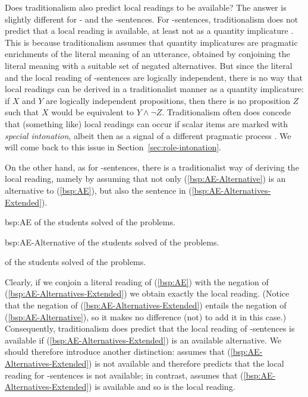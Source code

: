 \documentclass[fleqn,reqno,10pt,draft]{article}
\newcommand{\as}{\acro{as}}
\renewcommand{\es}{\acro{es}}
\begin{document}
Does traditionalism also predict local readings to be available?  The
answer is slightly different for \as- and the \es-sentences. For
\es-sentences, traditionalism does not predict that a local reading is
available, at least not as a quantity implicature
\citep[c.f.][]{GeurtsPouscoulous2009:Embedded-Implic,ChemlaSpector2010:Experimental-Ev}. This
is because traditionalism assumes that quantity implicatures are
pragmatic enrichments of the literal meaning of an utterance, obtained
by conjoining the literal meaning with a suitable set of negated
alternatives. But since the literal and the local reading of
\es-sentences are logically independent, there is no way that local
readings can be derived in a traditionalist manner as a quantity
implicature: if $X$ and $Y$ are logically independent propositions,
then there is no proposition $Z$ such that $X$ would be equivalent to
$Y \wedge \neg Z$. Traditionalism often does concede that (something
like) local readings can occur if scalar items are marked with
\emph{special intonation}, albeit then as a signal of a different
pragmatic process
\citep[e.g.][]{Horn2006:The-Border-Wars,Geurts2009:Scalar-Implicat,Geurts2010:Quantity-Implic}. We
will come back to this issue in Section~\ref{sec:role-intonation}.

On the other hand, as for \as-sentences, there is a traditionalist way
of deriving the local reading, namely by assuming that not only
(\ref{bsp:AE-Alternative}) is an alternative to (\ref{bsp:AE}), but
also the sentence in (\ref{bsp:AE-Alternatives-Extended}).

\begin{exer}{bsp:AE}
  \ex {} of the students solved  of the problems.
\end{exer}

\begin{exer}{bsp:AE-Alternative}
  \ex {} of the students solved  of the problems.
\end{exer}

\begin{exe}
\ex \label{bsp:AE-Alternatives-Extended}  of the students solved  of the problems.
\end{exe}

\noindent Clearly, if we conjoin a literal reading of (\ref{bsp:AE})
with the negation of (\ref{bsp:AE-Alternatives-Extended}) we obtain
exactly the local reading. (Notice that the negation of
(\ref{bsp:AE-Alternatives-Extended}) entails the negation of
(\ref{bsp:AE-Alternative}), so it makes no difference (not) to add it
in this case.) Consequently, traditionalism does predict that the
local reading of \as-sentences is available if
(\ref{bsp:AE-Alternatives-Extended}) is an available alternative. We
should therefore introduce another distinction:  assumes that (\ref{bsp:AE-Alternatives-Extended}) is
not available and therefore predicts that the local reading for
\as-sentences is not available; in contrast,  assumes that (\ref{bsp:AE-Alternatives-Extended}) is
available and so is the local reading.
\end{document}
